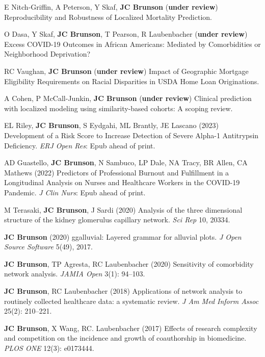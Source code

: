 \documentclass[10pt,a4paper]{article}
\begin{document}
\begin{enumerate}[label={[\arabic*]},labelindent=1cm,nolistsep]
\item
E Nitch-Griffin, A Peterson, Y Skaf, {\bfseries JC Brunson} ({\bfseries under review}) Reproducibility and Robustness of Localized Mortality Prediction.
\item
O Dasa, Y Skaf, {\bfseries JC Brunson}, T Pearson, R Laubenbacher ({\bfseries under review}) Excess COVID-19 Outcomes in African Americans: Mediated by Comorbidities or Neighborhood Deprivation?
\item
RC Vaughan, {\bfseries JC Brunson} ({\bfseries under review}) Impact of Geographic Mortgage Eligibility Requirements on Racial Disparities in USDA Home Loan Originations.
\item
A Cohen, P McCall-Junkin, {\bfseries JC Brunson} ({\bfseries under review}) Clinical prediction with localized modeling using similarity-based cohorts: A scoping review.
\item
EL Riley, {\bfseries JC Brunson}, S Eydgahi, ML Brantly, JE Lascano (2023) Development of a Risk Score to Increase Detection of Severe Alpha-1 Antitrypsin Deficiency. {\itshape ERJ Open Res}: Epub ahead of print.
\item
AD Guastello, {\bfseries JC Brunson}, N Sambuco, LP Dale, NA Tracy, BR Allen, CA Mathews (2022) Predictors of Professional Burnout and Fulfillment in a Longitudinal Analysis on Nurses and Healthcare Workers in the COVID-19 Pandemic. {\itshape J Clin Nurs}: Epub ahead of print.
\item
M Terasaki, {\bfseries JC Brunson}, J Sardi (2020) Analysis of the three dimensional structure of the kidney glomerulus capillary network. {\itshape Sci Rep} 10, 20334.
\item
{\bfseries JC Brunson} (2020) ggalluvial: Layered grammar for alluvial plots. {\itshape J Open Source Software} 5(49), 2017.
\item
{\bfseries JC Brunson}, TP Agresta, RC Laubenbacher (2020) Sensitivity of comorbidity network analysis. {\itshape JAMIA Open} 3(1): 94--103.
\item
{\bfseries JC Brunson}, RC Laubenbacher (2018) Applications of network analysis to routinely collected healthcare data: a systematic review. {\itshape J Am Med Inform Assoc} 25(2): 210--221.
\item
{\bfseries JC Brunson}, X Wang, RC. Laubenbacher (2017) Effects of research complexity and competition on the incidence and growth of coauthorship in biomedicine. {\itshape PLOS ONE} 12(3): e0173444.

\end{enumerate}
\end{document}
